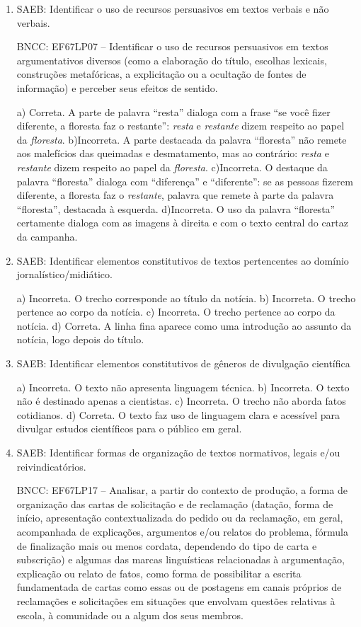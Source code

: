 \begin{enumerate}

\item
SAEB: Identificar o uso de recursos persuasivos em textos verbais e
não verbais.

BNCC: EF67LP07 -- Identificar o uso de recursos persuasivos em textos
argumentativos diversos (como a elaboração do título, escolhas lexicais,
construções metafóricas, a explicitação ou a ocultação de fontes de
informação) e perceber seus efeitos de sentido.

a) Correta. A parte de palavra ``resta'' dialoga com a frase ``se você fizer diferente, a floresta faz o
restante'': \textit{resta} e \textit{restante} dizem respeito ao papel da \textit{floresta}.     
b)Incorreta. A parte destacada da palavra ``floresta'' não remete aos malefícios das queimadas e desmatamento, 
mas ao contrário: \textit{resta} e \textit{restante} dizem respeito ao papel da \textit{floresta}. 
c)Incorreta. O destaque da palavra ``floresta'' dialoga com ``diferença'' e ``diferente'': se as pessoas fizerem
diferente, a floresta faz o \textit{restante}, palavra que remete à parte da palavra ``floresta'', destacada 
à esquerda. 
d)Incorreta. O uso da palavra ``floresta'' certamente dialoga com as imagens à direita e com o texto central do cartaz da campanha.

\item
SAEB: Identificar elementos constitutivos de textos pertencentes ao
domínio jornalístico/midiático.

a) Incorreta. O trecho corresponde ao título da notícia.
b) Incorreta. O trecho pertence ao corpo da notícia.
c) Incorreta. O trecho pertence ao corpo da notícia.
d) Correta. A linha fina aparece como uma introdução ao assunto da notícia, logo depois do título.

\item 
SAEB: Identificar elementos constitutivos de gêneros de divulgação científica

a) Incorreta. O texto não apresenta linguagem técnica. 
b) Incorreta. O texto não é destinado apenas a cientistas.
c) Incorreta. O trecho não aborda fatos cotidianos. 
d) Correta. O texto faz uso de linguagem clara e acessível para divulgar estudos científicos
para o público em geral.

\item
SAEB: Identificar formas de organização de textos normativos, legais e/ou
reivindicatórios.

BNCC: EF67LP17 -- Analisar, a partir do contexto de produção, a forma de
organização das cartas de solicitação e de reclamação (datação, forma de
início, apresentação contextualizada do pedido ou da reclamação, em
geral, acompanhada de explicações, argumentos e/ou relatos do problema,
fórmula de finalização mais ou menos cordata, dependendo do tipo de
carta e subscrição) e algumas das marcas linguísticas relacionadas à
argumentação, explicação ou relato de fatos, como forma de possibilitar
a escrita fundamentada de cartas como essas ou de postagens em canais
próprios de reclamações e solicitações em situações que envolvam
questões relativas à escola, à comunidade ou a algum dos seus membros.



\end{enumerate}
